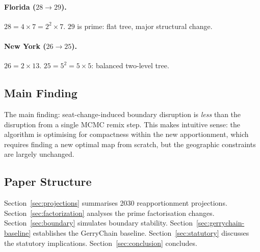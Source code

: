 \paragraph{Florida ($28 \to 29$).}
$28 = 4 \times 7 = 2^2 \times 7$.
$29$ is prime: flat tree, major structural change.

\paragraph{New York ($26 \to 25$).}
$26 = 2 \times 13$.
$25 = 5^2 = 5 \times 5$: balanced two-level tree.

\subsection{Main Finding}

The main finding: seat-change-induced boundary disruption is \emph{less}
than the disruption from a single \recom{} MCMC remix step.
This makes intuitive sense: the \ar{} algorithm is optimising for compactness
within the new apportionment, which requires finding a new optimal map
from scratch, but the geographic constraints are largely unchanged.

\subsection{Paper Structure}

Section~\ref{sec:projections} summarises 2030 reapportionment projections.
Section~\ref{sec:factorization} analyses the prime factorisation changes.
Section~\ref{sec:boundary} simulates boundary stability.
Section~\ref{sec:gerrychain-baseline} establishes the GerryChain baseline.
Section~\ref{sec:statutory} discusses the statutory implications.
Section~\ref{sec:conclusion} concludes.
